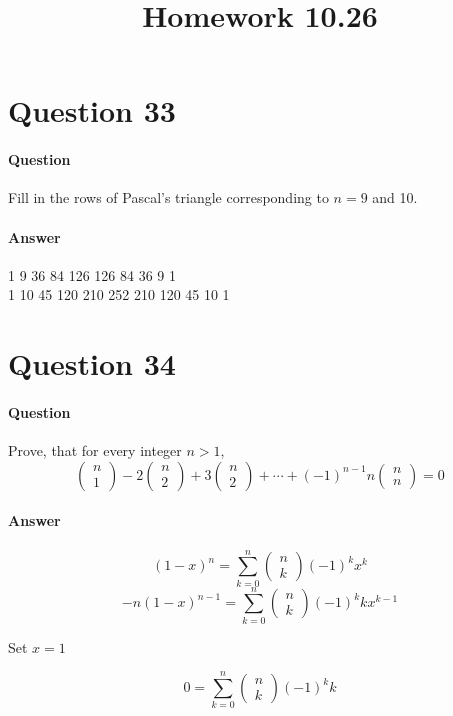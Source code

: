 \documentclass[UTF8]{article}
\title{Homework 10.26}
\begin{document}
\maketitle
\section{Question 33}
\paragraph{Question}
Fill in the rows of Pascal’s triangle corresponding to $n = 9$ and 10.
\paragraph{Answer}
\begin{center}
    1 9 36 84 126 126 84 36 9 1 \\
    1 10 45 120 210 252 210 120 45 10 1 \\
\end{center}
\section{Question 34}
\paragraph{Question}
Prove, that for every integer $n > 1$,
$$\begin{pmatrix} n \\ 1 \end{pmatrix} 
- 2\begin{pmatrix} n \\ 2 \end{pmatrix}
+ 3\begin{pmatrix} n \\ 2 \end{pmatrix}
+ \cdots +
\left( -1\right)^{n-1}n\begin{pmatrix} n \\ n \end{pmatrix}
 = 0
$$
\paragraph{Answer}
$$ \left(1-x\right)^n = \sum_{k=0}^{n}\begin{pmatrix} n \\ k \end{pmatrix} \left(-1\right)^{k} x^{k}$$
$$ -n\left(1-x\right)^{n-1} = \sum_{k=0}^{n}\begin{pmatrix} n \\ k \end{pmatrix} \left(-1\right)^{k} kx^{k-1}$$
\begin{center}
    Set $x = 1$
\end{center}
$$ 0 = \sum_{k=0}^{n}\begin{pmatrix} n \\ k \end{pmatrix} \left(-1\right)^{k} k$$
\end{document}
